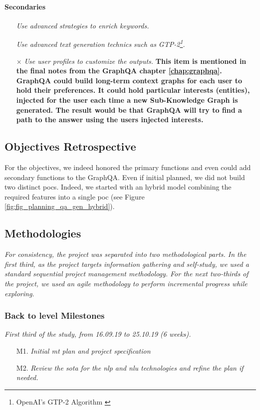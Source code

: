 \paragraph{Secondaries}
\begin{itemize}[noitemsep]
    \item[\checkmark] \textit{Use advanced strategies to enrich keywords.}
    \item[\checkmark] \textit{Use advanced text generation technics such as GTP-2\footnote{OpenAI's GTP-2 Algorithm \autocite{papers:gpt2}}.}
    \item[$\times$] \textit{Use user profiles to customize the outputs.} \textbf{This item is mentioned in the final notes from the GraphQA chapter \ref{chap:graphqa}. GraphQA could build long-term context graphs for each user to hold their preferences. It could hold particular interests (entities), injected for the user each time a new Sub-Knowledge Graph is generated. The result would be that GraphQA will try to find a path to the answer using the users injected interests.}
\end{itemize}

\subsection{Objectives Retrospective}
For the objectives, we indeed honored the primary functions and even could add secondary functions to the GraphQA. Even if initial planned, we did not build two distinct \glspl{poc}. Indeed, we started with an hybrid model combining the required features into a single \gls{poc} (see Figure \ref{fig:fig_planning_qa_gen_hybrid}).


\subsection{Methodologies}
\textit{For consistency, the project was separated into two methodological parts. In the first third, as the project targets information gathering and self-study, we used a standard sequential project management methodology. For the next two-thirds of the project, we used an agile methodology to perform incremental progress while exploring.}

\subsubsection{Back to level Milestones}
\textit{First third of the study, from 16.09.19 to 25.10.19 (6 weeks).}
\begin{enumerate}
    \setlength\itemsep{0em}
    \item[\checkmark M1.] \textit{Initial \gls{mt} plan and project specification}
    \item[\checkmark M2.] \textit{Review the \gls{sota} for the \gls{nlp} and \gls{nlu} technologies and refine the plan if needed.}
\end{enumerate}

